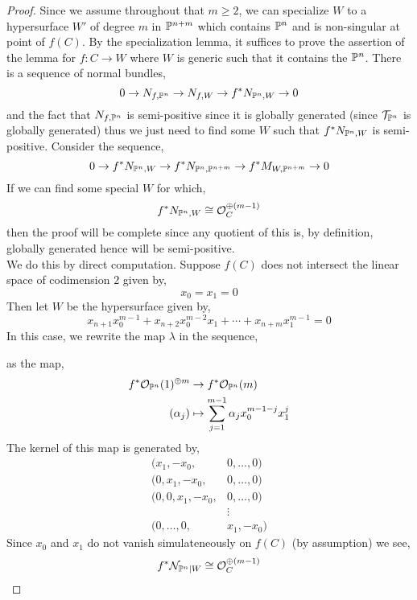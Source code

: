 \documentclass[12pt]{article}
\newcommand{\cN}{\mathcal{N}}
\begin{document}
\begin{proof}
Since we assume throughout that $m \ge 2$, we can specialize $W$ to a hypersurface $W'$ of degree $m$ in $\P^{n+m}$ which contains $\P^n$ and is non-singular at point of $f(C)$. By the specialization lemma, it suffices to prove the assertion of the lemma for $f : C \to W$ where $W$ is generic such that it contains the $\P^n$. There is a sequence of normal bundles,
\[ 0 \to N_{f, \P^n} \to N_{f, W} \to f^* N_{\P^n, W} \to 0 \]
and the fact that $N_{f, \P^n}$ is semi-positive since it is globally generated (since $\T_{\P^n}$ is globally generated) thus we just need to find some $W$ such that $f^* N_{\P^n, W}$ is semi-positive. Consider the sequence,
\[ 0 \to f^* N_{\P^n, W} \to f^* N_{\P^n, \P^{n+m}} \to f^* M_{W, \P^{n+m}} \to 0 \]
If we can find some special $W$ for which,
\[ f^* N_{\P^n, W} \cong \struct{C}^{\oplus (m-1)} \]
then the proof will be complete since any quotient of this is, by definition, globally generated hence will be semi-positive.
\bigskip\\
We do this by direct computation. Suppose $f(C)$ does not intersect the linear space of codimension $2$ given by,
\[ x_0 = x_1 = 0 \]
Then let $W$ be the hypersurface given by,
\[ x_{n+1} x_0^{m-1} + x_{n+2} x_0^{m-2} x_1 + \cdots + x_{n+m} x_1^{m-1} = 0 \]
In this case, we rewrite the map $\lambda$ in the sequence,
\begin{center}
\end{center}
as the map,
\begin{align*}
f^* \struct{\P^n}(1)^{\oplus m} & \to f^* \struct{\P^n}(m) 
\\
(\alpha_j) & \mapsto \sum_{j = 1}^{m-1} \alpha_j x_0^{m-1-j} x_1^j 
\end{align*}
The kernel of this map is generated by,
\begin{align*}
(x_1, -x_0, & 0, \dots, 0) 
\\
(0, x_1, -x_0, & 0, \dots, 0) 
\\
(0, 0, x_1, - x_0, & 0, \dots, 0)
\\
& \vdots
\\
(0, \dots, 0, & x_1, -x_0)
\end{align*}
Since $x_0$ and $x_1$ do not vanish simulateneously on $f(C)$ (by assumption) we see,
\[ f^* \cN_{\P^n | W} \cong \struct{C}^{\oplus (m-1)} \]
\end{proof}
\end{document}
